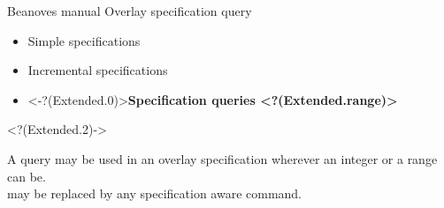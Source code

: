 \documentclass{beamer}
\begin{document}
\begin{frame}
{Beanoves manual}
{\large Overlay specification query}
\begin{itemize}
\item Simple specifications\hfill
{}
\item Incremental specifications\hfill
{}
\item \only<-?(Extended.0)>{}\bfseries\color{MyGreen}Specification queries\hfill
\visible<?(Extended.range)>{%
%
}%
\end{itemize}
\vspace{1\baselineskip}
\visible<?(Extended.2)->{%
A query may be used in an overlay specification wherever an integer or a range can be.%
\\ may be replaced by any specification aware command.
\vspace{1\baselineskip}

}%
\end{frame}
%
\end{document}
